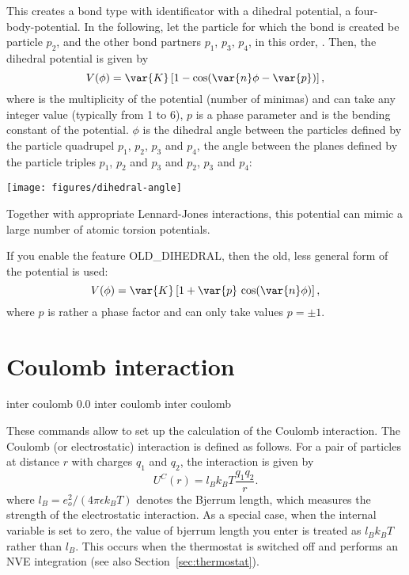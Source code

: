 This creates a bond type with identificator 
with a dihedral potential, \ie a four-body-potential. In the following,
let the particle for which the bond is created be particle $p_2$, and
the other bond partners $p_1$, $p_3$, $p_4$, in this order, \ie
{}. Then, the
dihedral potential is given by
\begin{equation}
  V(\phi) = \var{K}\left[1 - \cos(\var{n}\phi - \var{p})\right],
\end{equation}
where  is the multiplicity of the potential (number of minimas)
and can take any integer value (typically from 1 to 6), $p$ is a phase
parameter and  is the bending constant of the potential. $\phi$
is the dihedral angle between the particles defined by the particle
quadrupel $p_1$, $p_2$, $p_3$ and $p_4$, \ie the angle between the
planes defined by the particle triples $p_1$, $p_2$ and $p_3$ and
$p_2$, $p_3$ and $p_4$:
\begin{center}
  \texttt{[image: figures/dihedral-angle]}
\end{center}
Together with appropriate Lennard-Jones interactions, this potential
can mimic a large number of atomic torsion potentials.

If you enable the feature OLD_DIHEDRAL, then the old, less
general form of the potential is used:
\begin{equation}
  V(\phi) = \var{K}\left[1 + \var{p}\,\cos(\var{n}\phi)\right],
\end{equation}
where $p$ is rather a phase factor and can only take values $p=\pm 1$.


\section{Coulomb interaction}
\label{sec:inter-electrostatics}

\begin{essyntax}
   inter coulomb 0.0
   inter coulomb
   inter coulomb 
\end{essyntax}

These commands allow to set up the calculation of the Coulomb
interaction.  The Coulomb (or electrostatic) interaction is defined as
follows.  For a pair of particles at distance $r$ with charges $q_1$
and $q_2$, the interaction is given by
\begin{equation}
  U^C(r)=l_B k_B T\frac{q_1 q_2}{r}.
\end{equation}
where $l_B = e_o^2 / (4 \pi \epsilon k_B T)$ denotes the Bjerrum
length, which measures the strength of the electrostatic interaction.
As a special case, when the internal variable  
is set to zero, the value of bjerrum length you enter 
is treated as $l_B k_B T$ rather than $l_B$. This occurs when the
thermostat is switched off and \es performs an NVE integration
(see also Section~\ref{sec:thermostat}).

